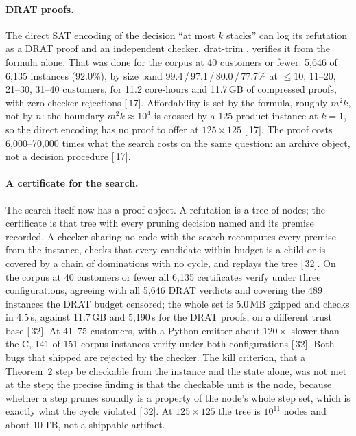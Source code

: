 \documentclass[11pt,a4paper]{article}
\renewcommand{\S}[1]{[\textsection\,#1]}
\begin{document}
\paragraph{DRAT proofs.}
The direct SAT encoding of the decision ``at most $k$ stacks'' can log its
refutation as a DRAT proof and an independent checker, drat-trim
\citep{WetzlerHeuleHunt2014}, verifies it from the formula alone. That was
done for the corpus at 40 customers or fewer: 5,646 of 6,135 instances
(92.0\%), by size band 99.4\,/\,97.1\,/\,80.0\,/\,77.7\% at $\le 10$, 11--20,
21--30, 31--40 customers, for 11.2 core-hours and 11.7\,GB of compressed
proofs, with zero checker rejections \S{17}. Affordability is set by the
formula, roughly $m^2 k$, not by $n$: the boundary $m^2 k \approx 10^4$ is
crossed by a 125-product instance at $k = 1$, so the direct encoding has no
proof to offer at $125 \times 125$ \S{17}. The proof costs 6,000--70,000
times what the search costs on the same question: an archive object, not a
decision procedure \S{17}.

\paragraph{A certificate for the search.}
The search itself now has a proof object. A refutation is a tree of nodes;
the certificate is that tree with every pruning decision named and its
premise recorded. A checker sharing no code with the search recomputes every
premise from the instance, checks that every candidate within budget is a
child or is covered by a chain of dominations with no cycle, and replays the
tree \S{32}. On the corpus at 40 customers or fewer all 6,135 certificates
verify under three configurations, agreeing with all 5,646 DRAT verdicts and
covering the 489 instances the DRAT budget censored; the whole set is 5.0\,MB
gzipped and checks in 4.5\,s, against 11.7\,GB and 5,190\,s for the DRAT
proofs, on a different trust base \S{32}. At 41--75 customers, with a Python
emitter about $120\times$ slower than the C, 141 of 151 corpus instances
verify under both configurations \S{32}. Both bugs that shipped are rejected
by the checker. The kill criterion, that a Theorem~2 step be checkable from
the instance and the state alone, was not met at the step; the precise
finding is that the checkable unit is the node, because whether a step prunes
soundly is a property of the node's whole step set, which is exactly what the
cycle violated \S{32}. At $125 \times 125$ the tree is $10^{11}$ nodes and
about 10\,TB, not a shippable artifact.
\end{document}

